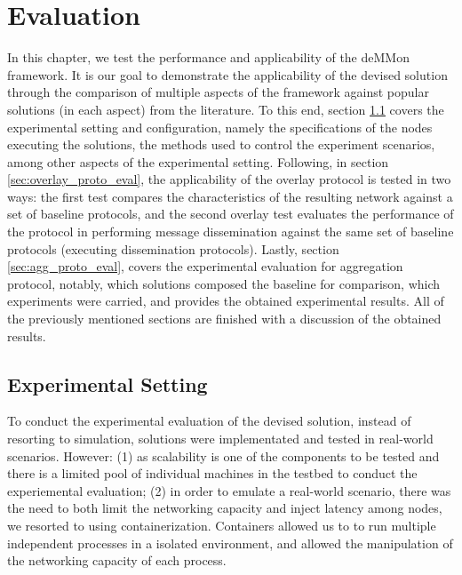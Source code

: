 

\chapter{Evaluation}
\label{cha:evaluation}

In this chapter, we test the performance and applicability of the deMMon framework. It is our goal to demonstrate the applicability of the devised solution through the comparison of multiple aspects of the framework against popular solutions (in each aspect) from the literature. To this end, section \ref{sec:exp_setting_conf} covers the experimental setting and configuration, namely the specifications of the nodes executing the solutions, the methods used to control the experiment scenarios, among other aspects of the experimental setting. Following, in section \ref{sec:overlay_proto_eval}, the applicability of the overlay protocol is tested in two ways: the first test compares the characteristics of the resulting network against a set of baseline protocols, and the second overlay test evaluates the performance of the protocol in performing message dissemination against the same set of baseline protocols (executing dissemination protocols). Lastly, section \ref{sec:agg_proto_eval}, covers the experimental evaluation for aggregation protocol, notably, which solutions composed the baseline for comparison, which experiments were carried, and provides the obtained experimental results. All of the previously mentioned sections are finished with a discussion of the obtained results.

\section{Experimental Setting} \label{sec:exp_setting_conf}

To conduct the experimental evaluation of the devised solution, instead of resorting to simulation, solutions were implementated and tested in real-world scenarios. However: (1) as scalability is one of the components to be tested and there is a limited pool of individual machines in the testbed to conduct the experiemental evaluation; (2) in order to emulate a real-world scenario, there was the need to both limit the networking capacity and inject latency among nodes, we resorted to using containerization. Containers allowed us to to run multiple independent processes in a isolated environment, and allowed the manipulation of the networking capacity of each process. 

